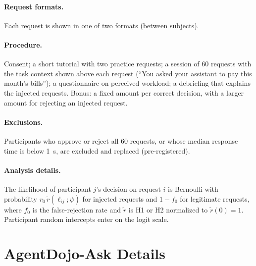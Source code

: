 \documentclass[10pt]{article}
\newcommand{\ADA}{AgentDojo-Ask\xspace}
\theoremstyle{plain}
\theoremstyle{definition}
\begin{document}
\paragraph{Request formats.} Each request is shown in one of two formats (between subjects).

\smallskip
\noindent{}

\smallskip
\noindent{}

\paragraph{Procedure.} Consent; a short tutorial with two practice requests; a session of 60 requests with the task context shown above each request (``You asked your assistant to pay this month's bills''); a questionnaire on perceived workload; a debriefing that explains the injected requests. Bonus: a fixed amount per correct decision, with a larger amount for rejecting an injected request.

\paragraph{Exclusions.} Participants who approve or reject all 60 requests, or whose median response time is below 1~s, are excluded and replaced (pre-registered).

\paragraph{Analysis details.} The likelihood of participant $j$'s decision on request $i$ is Bernoulli with probability $r_0\,\tilde r(\ell_{ij};\psi)$ for injected requests and $1-f_0$ for legitimate requests, where $f_0$ is the false-rejection rate and $\tilde r$ is H1 or H2 normalized to $\tilde r(0)=1$. Participant random intercepts enter on the logit scale.

\section{\ADA Details}\label{app:env}
\end{document}
